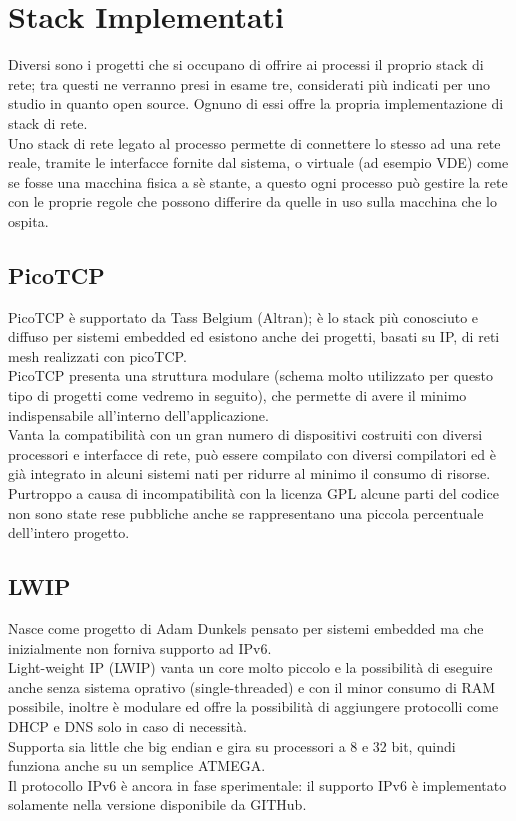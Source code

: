 \section{Stack Implementati}
Diversi sono i progetti che si occupano di offrire ai processi il proprio stack di rete; tra questi ne verranno presi in esame tre, considerati pi\`u indicati per uno studio in quanto open source. Ognuno di essi offre la propria implementazione di stack di rete.\\
Uno stack di rete legato al processo permette di connettere lo stesso ad una rete reale, tramite le interfacce fornite dal sistema, o virtuale (ad esempio VDE) come se fosse una macchina fisica a s\`e stante, a questo ogni processo pu\`o gestire la rete con le proprie regole che possono differire da quelle in uso sulla macchina che lo ospita.

\subsection{PicoTCP}
PicoTCP\cite{K4} \`e supportato da Tass Belgium (Altran); \`e lo stack pi\`u conosciuto e diffuso per sistemi embedded ed esistono anche dei progetti, basati su IP, di reti mesh realizzati con picoTCP\cite{K14}.\\
PicoTCP presenta una struttura modulare (schema molto utilizzato per questo tipo di progetti come vedremo in seguito), che permette di avere il minimo indispensabile all'interno dell'applicazione.\\
Vanta la compatibilit\`a con un gran numero di dispositivi costruiti con diversi processori e interfacce di rete, pu\`o essere compilato con diversi compilatori ed \`e gi\`a integrato in alcuni sistemi nati per ridurre al minimo il consumo di risorse.\\
Purtroppo a causa di incompatibilit\`a con la licenza GPL alcune parti del codice non sono state rese pubbliche anche se rappresentano una piccola percentuale dell'intero progetto.
\subsection{LWIP}
Nasce come progetto di Adam Dunkels pensato per sistemi embedded ma che inizialmente non forniva supporto ad IPv6.\\
Light-weight IP (LWIP\cite{K13}) vanta un core molto piccolo e la possibilit\`a di eseguire anche senza sistema oprativo (single-threaded) e con il minor consumo di RAM possibile, inoltre \`e modulare ed offre la possibilit\`a di aggiungere protocolli come DHCP e DNS solo in caso di necessit\`a.\\
Supporta sia little che big endian e gira su processori a 8 e 32 bit, quindi funziona anche su un semplice ATMEGA.\\
Il protocollo IPv6 \`e ancora in fase sperimentale: il supporto IPv6 \`e implementato solamente nella versione disponibile da GITHub.
